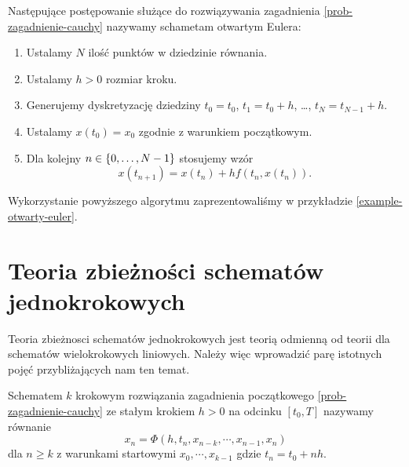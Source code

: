 \documentclass[12pt,a4paper]{report}
\begin{document}
\begin{algorithm}
Następujące postępowanie służące do rozwiązywania zagadnienia \ref{prob-zagadnienie-cauchy} nazywamy schametam otwartym Eulera:
\begin{enumerate}
\item Ustalamy $N$ ilość punktów w dziedzinie równania. 
\item Ustalamy $h>0$ rozmiar kroku.
\item Generujemy dyskretyzację dziedziny $t_0 = t_0$, $t_1 = t_0 + h$, \ldots, $t_N = t_{N-1}+h$. 
\item Ustalamy $x(t_0) = x_0$ zgodnie z warunkiem początkowym.
\item Dla kolejny $n \in \left\lbrace {0, \ldots, N-1} \right\rbrace$ stosujemy wzór
$$
x(t_{n+1}) = x(t_n) + h f(t_n, x(t_n)).
$$
\end{enumerate}
\end{algorithm}

Wykorzystanie powyższego algorytmu zaprezentowaliśmy w przykładzie \ref{example-otwarty-euler}.

\section{Teoria zbieżności schematów jednokrokowych}
Teoria zbieżnosci schematów jednokrokowych jest teorią odmienną od teorii dla schematów wielokrokowych liniowych. Należy więc wprowadzić parę istotnych pojęć przybliżających nam ten temat. 

\begin{definition} 
Schematem $k$ krokowym rozwiązania zagadnienia początkowego \ref{prob-zagadnienie-cauchy} ze stałym krokiem $h>0$ na odcinku $[t_0,T]$ nazywamy równanie
$$
x_n = \Phi (h,t_n,x_{n-k},\cdots,x_{n-1},x_n) \label{k-steps-scheme}
$$
dla $ n \geq k$ z warunkami startowymi $x_0,\cdots, x_{k-1}$ gdzie $t_n = t_0 + nh$.
\end{definition}
\end{document}
